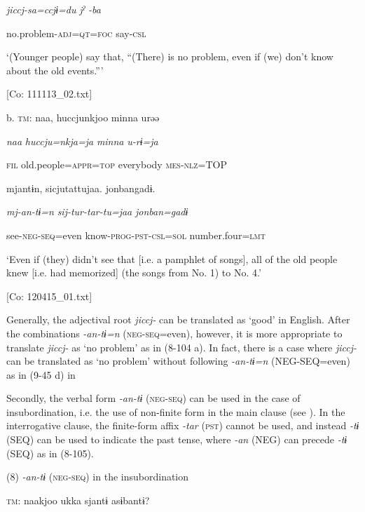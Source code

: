       \textit{jiccj-sa=ccjɨ=du}  \textit{jˀ} \textit{-ba}

      no.problem-\textsc{adj}=\textsc{qt}=\textsc{foc}  say-\textsc{csl}

      ‘(Younger people) say that, “(There) is no problem, even if (we) don’t know about the old events.”’

      [Co: 111113\_02.txt]

  b.  \textsc{tm}:  naa,  huccjunkjoo  minna  urəə

      \textit{naa}  \textit{huccju=nkja=ja}  \textit{minna}  \textit{u-rɨ=ja}

      \textsc{fil}  old.people=\textsc{appr}=\textsc{top}  everybody  \textsc{mes}-\textsc{nlz}=TOP

      mjantɨn,  sicjutattujaa.  {\textbar}jonban{\textbar}gadɨ.

      \textit{mj-an-tɨ=n}  \textit{sij-tur-tar-tu=jaa}  \textit{jonban=gadɨ}

      see-\textsc{neg}-\textsc{seq}=even  know-\textsc{prog}-\textsc{pst}-\textsc{csl}=\textsc{sol}  number.four=\textsc{lmt}

      ‘Even if (they) didn’t see that [i.e. a pamphlet of songs], all of the old people knew [i.e. had memorized] (the songs from No. 1) to No. 4.’

      [Co: 120415\_01.txt]

Generally, the adjectival root \textit{jiccj-} can be translated as ‘good’ in English. After the combinations \textit{{}-an-tɨ=n} (\textsc{neg}-\textsc{seq}=even), however, it is more appropriate to translate \textit{jiccj-} as ‘no problem’ as in (8-104 a). In fact, there is a case where \textit{jiccj-} can be translated as ‘no problem’ without following \textit{{}-an-tɨ=n} (NEG-SEQ=even) as in (9-45 d) in 

  Secondly, the verbal form \textit{{}-an-tɨ} (\textsc{neg}-\textsc{seq}) can be used in the case of insubordination, i.e. the use of non-finite form in the main clause (see ). In the interrogative clause, the finite-form affix \textit{{}-tar} (\textsc{pst}) cannot be used, and instead \textit{{}-tɨ} (SEQ) can be used to indicate the past tense, where \textit{{}-an} (NEG) can precede \textit{{}-tɨ} (SEQ) as in (8-105).

(8)  \textit{{}-an-tɨ} (\textsc{neg}-\textsc{seq}) in the insubordination

  \textsc{tm}:  naakjoo  ukka  sjantɨ  asɨbantɨ?

